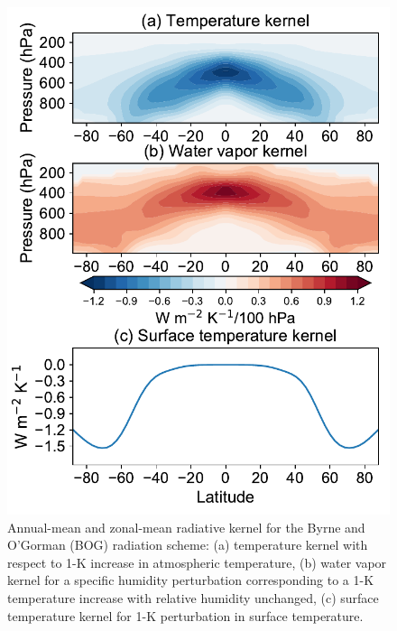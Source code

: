 \begin{figure}[ht]
	\centering
	\includegraphics[width=0.45\linewidth]{figs/polar_amp/kernels_byrne}
	\caption[Annual-mean and zonal-mean temperature, water vapor and surface temperature radiative kernels for BOG radiation scheme]{Annual-mean and zonal-mean radiative kernel for the Byrne and O'Gorman (BOG) radiation scheme: (a) temperature kernel with respect to 1-K increase in atmospheric temperature, (b) water vapor kernel for a specific humidity perturbation corresponding to a 1-K temperature increase with relative humidity unchanged, (c) surface temperature kernel for 1-K perturbation in surface temperature.}
	\label{fig:bog_kernels}
\end{figure}


